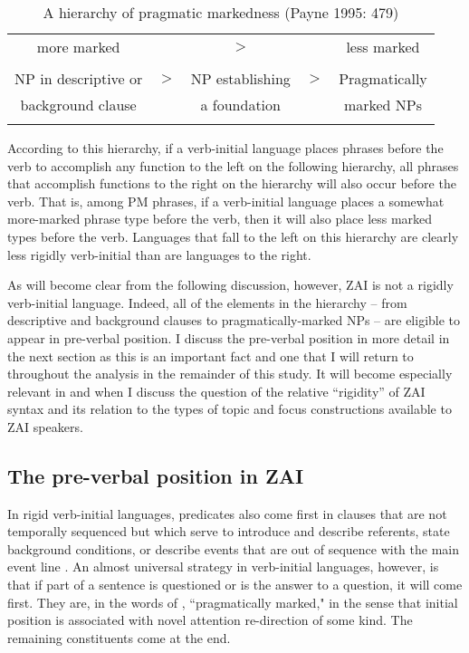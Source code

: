 \singlespacing
\begin{table}

\begin{tabular}{ c c c c c }
\midrule
more marked & & $>$ & & less marked \\
 & & &  & \\
NP in descriptive or &  $>$ & NP establishing & $>$ & Pragmatically  \\
background clause &  & a foundation &  &  marked NPs \\

\lspbottomrule
\end{tabular}\caption{{A hierarchy of pragmatic markedness (Payne 1995: 479)}}
\label{pragmaticmarkednesstable}

\end{table} 
According to this hierarchy, if a verb-initial language places phrases before the verb to accomplish any function to the left on the following hierarchy, all phrases that accomplish functions to the right on the hierarchy will also occur before the verb. That is, among PM phrases, if a verb-initial language places a somewhat more-marked phrase type before the verb, then it will also place less marked types before the verb. Languages that fall to the left on this hierarchy are clearly less rigidly verb-initial than are languages to the right.

As will become clear from the following discussion, however, ZAI is not a rigidly verb-initial language. Indeed, all of the elements in the hierarchy -- from descriptive and background clauses to pragmatically-marked NPs -- are eligible to appear in pre-verbal position. I discuss the pre-verbal position in more detail in the next section as this is an important fact and one that I will return to throughout the analysis in the remainder of this study. It will become especially relevant in  and  when I discuss the question of the relative ``rigidity'' of ZAI syntax and its relation to the types of topic and focus constructions available to ZAI speakers. 


\subsection{The pre-verbal position in ZAI}\label{pre-verbalpos}

In rigid verb-initial languages, predicates also come first in clauses that are not temporally sequenced but which serve to introduce and describe referents, state background conditions, or describe events that are out of sequence with the main event line \citep[454]{payne1995}. An almost universal strategy in verb-initial languages, however, is that if part of a sentence is questioned or is the answer to a question, it will come first. They are, in the words of \citet{payne1995}, ``pragmatically marked," in the sense that initial position is associated with novel attention re-direction of some kind. The remaining constituents come at the end. 

